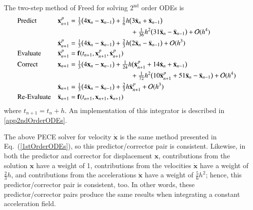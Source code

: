 The two-step method of Freed \cite{Freed17a} for solving $2^{\text{nd}}$ order ODEs is
\begin{subequations}
    \label{pairedMethods}
    \begin{align}
    \mbox{} & \text{Predict} &
    \mathbf{x}_{n+1}^p & = \tfrac{1}{3} \bigl(
    4 \mathbf{x}_n - \mathbf{x}_{n-1} \bigr) + 
    \tfrac{1}{6} h \bigl( 3 \dot{\mathbf{x}}_n + 
    \dot{\mathbf{x}}_{n-1} \bigr) \notag \\ 
    \mbox{} & & & \hspace{3.175cm} + 
    \tfrac{1}{36} h^2 \bigl( 31 \ddot{\mathbf{x}}_n - 
    \ddot{\mathbf{x}}_{n-1} \bigr) + \mathcal{O} (h^4) 
    \label{displacementPredictor} \\
    \mbox{} & &
    \dot{\mathbf{x}}_{n+1}^p & = \tfrac{1}{3} 
    \bigl( 4 \dot{\mathbf{x}}_n - \dot{\mathbf{x}}_{n-1} \bigr) + 
    \tfrac{2}{3} h \bigl( 2\ddot{\mathbf{x}}_n - \ddot{\mathbf{x}}_{n-1} 
    \bigr) + \mathcal{O} (h^3)
    \label{velocityPredictor} \\
    \mbox{} & \text{Evaluate} &
    \ddot{\mathbf{x}}^p_{n+1} & = \mathbf{f} (t_{n+1}, \mathbf{x}^p_{n+1}, \dot{\mathbf{x}}^p_{n+1}) 
    \label{2ndEvaluate} \\
    \mbox{} & \text{Correct} & 
    \mathbf{x}_{n+1} & = \tfrac{1}{3} \bigl(
    4  \mathbf{x}_n - \mathbf{x}_{n-1} \bigr) +
    \tfrac{1}{24} h \bigl( \dot{\mathbf{x}}^p_{n+1} +
    14 \dot{\mathbf{x}}_n + \dot{\mathbf{x}}_{n-1} \bigr) 
    \notag \\
    \mbox{} & & & \hspace{3.175cm} +
    \tfrac{1}{72} h^2 \bigl( 10 \ddot{\mathbf{x}}^p_{n+1} + 
    51 \ddot{\mathbf{x}}_n - \ddot{\mathbf{x}}_{n-1} \bigr) + 
    \mathcal{O} (h^4)
    \label{displacementCorrector} \\ 
    \mbox{} & &
    \dot{\mathbf{x}}_{n+1} & = \tfrac{1}{3} 
    \bigl( 4 \dot{\mathbf{x}}_n - \dot{\mathbf{x}}_{n-1} \bigr) + 
    \tfrac{2}{3} h \ddot{\mathbf{x}}^p_{n+1} + \mathcal{O} (h^3)
    \label{velocityCorrector} \\
    \mbox{} & \text{Re-Evaluate} & 
    \ddot{\mathbf{x}}_{n+1} & = \mathbf{f} (t_{n+1}, \mathbf{x}_{n+1}, \dot{\mathbf{x}}_{n+1})
    \label{2ndReEvaluate}
    \end{align}
\end{subequations}
where $t_{n+1} = t_n + h$.  An implementation of this integrator is described in \ref{app2ndOrderODEs}.  

The above PECE solver for velocity $\dot{\mathbf{x}}$ is the same method presented in Eq.~(\ref{1stOrderODEs}), so this predictor\slash corrector pair is consistent.  Likewise, in both the predictor and corrector for displacement $\mathbf{x}$, contributions from the solution $\mathbf{x}$ have a weight of 1, contributions from the velocities $\dot{\mathbf{x}}$ have a weight of $\tfrac{2}{3} h$, and contributions from the accelerations $\ddot{\mathbf{x}}$ have a weight of $\tfrac{5}{6} h^2$; hence, this predictor\slash corrector pair is consistent, too.  In other words, these predictor\slash corrector pairs produce the same results when integrating a constant acceleration field.

